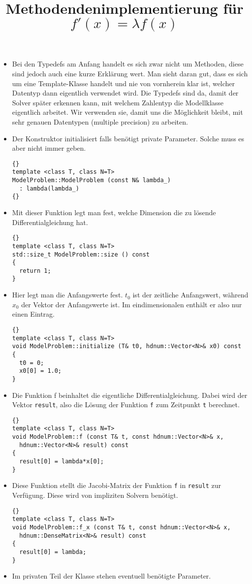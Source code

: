 \documentclass[a4paper,11pt]{article}
\theoremstyle{definition}
\begin{document}
\title{\textbf{Methodendenimplementierung für $f'(x) = \lambda f(x)$}}
\begin{itemize}
\item Bei den Typedefs am Anfang handelt es sich zwar nicht um Methoden, diese sind jedoch auch eine kurze Erklärung wert. Man sieht daran gut, dass es sich um eine Template-Klasse handelt und nie von vornherein klar ist, welcher Datentyp dann eigentlich verwendet wird. Die Typedefs sind da, damit der Solver später erkennen kann, mit welchem Zahlentyp die Modellklasse eigentlich arbeitet. Wir verwenden sie, damit uns die Möglichkeit bleibt, mit sehr genauen Datentypen (multiple precision) zu arbeiten. 

\item Der Konstruktor initialisiert falls benötigt private Parameter. Solche muss es aber nicht immer geben.
{\footnotesize{\begin{lstlisting}{}
template <class T, class N=T>
ModelProblem::ModelProblem (const N& lambda_)
  : lambda(lambda_)
{}
\end{lstlisting}}}

\item Mit dieser Funktion legt man fest, welche Dimension die zu lösende Differentialgleichung hat.
{\footnotesize{\begin{lstlisting}{}
template <class T, class N=T>
std::size_t ModelProblem::size () const
{
  return 1;
}
\end{lstlisting}}}
\item Hier legt man die Anfangswerte fest. $t_0$ ist der zeitliche Anfangswert, während $x_0$ der Vektor der Anfangswerte ist. Im eindimensionalen enthält er also nur einen Eintrag.
{\footnotesize{\begin{lstlisting}{}
template <class T, class N=T>
void ModelProblem::initialize (T& t0, hdnum::Vector<N>& x0) const
{
  t0 = 0;
  x0[0] = 1.0;
}
\end{lstlisting}}}
\item Die Funktion f beinhaltet die eigentliche Differentialgleichung. Dabei wird der Vektor \lstinline{result}, also die Lösung der Funktion \lstinline{f} zum Zeitpunkt \lstinline{t} berechnet.
{\footnotesize{\begin{lstlisting}{}
template <class T, class N=T>
void ModelProblem::f (const T& t, const hdnum::Vector<N>& x,
  hdnum::Vector<N>& result) const
{
  result[0] = lambda*x[0];
}
\end{lstlisting}}}
\item Diese Funktion stellt die Jacobi-Matrix der Funktion \lstinline{f} in \lstinline{result} zur Verfügung. Diese wird von impliziten Solvern benötigt.
{\footnotesize{\begin{lstlisting}{}
template <class T, class N=T>
void ModelProblem::f_x (const T& t, const hdnum::Vector<N>& x,
  hdnum::DenseMatrix<N>& result) const
{
  result[0] = lambda;
}
\end{lstlisting}}}
\item Im privaten Teil der Klasse stehen eventuell benötigte Parameter.

\end{itemize}
\end{document}
